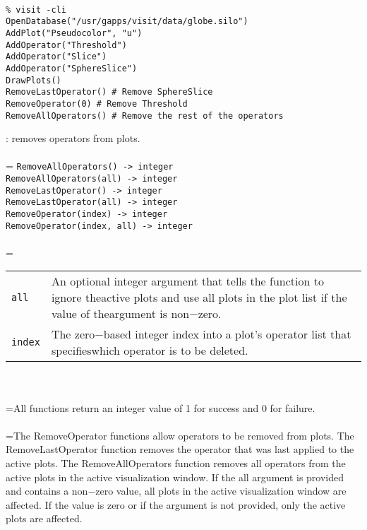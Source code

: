\documentclass[10pt,a4paper]{report}
\begin{document}
\\[-6mm]
\begin{verbatim}% visit -cli
OpenDatabase("/usr/gapps/visit/data/globe.silo")
AddPlot("Pseudocolor", "u")
AddOperator("Threshold")
AddOperator("Slice")
AddOperator("SphereSlice")
DrawPlots()
RemoveLastOperator() # Remove SphereSlice
RemoveOperator(0) # Remove Threshold
RemoveAllOperators() # Remove the rest of the operators
\end{verbatim}
\newpage


{}
: removes operators from plots.\\[-3mm]

 \\ 
\hangindent=\parindent 
\verb!RemoveAllOperators() -> integer!\\ 
\verb!RemoveAllOperators(all) -> integer!\\ 
\verb!RemoveLastOperator() -> integer!\\ 
\verb!RemoveLastOperator(all) -> integer!\\ 
\verb!RemoveOperator(index) -> integer!\\ 
\verb!RemoveOperator(index, all) -> integer!\\ [-3mm]

 \\ 
\hangindent=\parindent 
\begin{tabular}{lp{9cm}}
\verb!all! & An optional integer argument that tells the function to ignore theactive plots and use all plots in the plot list if the value of theargument is non$-$zero. \\
\verb!index! & The zero$-$based integer index into a plot's operator list that specifieswhich operator is to be deleted. \\
\end{tabular} \\[-2mm]


 \\ 
\hangindent=\parindent All functions return an integer value of 1 for success and 0 for failure. \\[-3mm] 

 \\ 
\hangindent=\parindent The RemoveOperator functions allow operators to be removed from plots. The RemoveLastOperator function removes the operator that was last applied to the active plots. The RemoveAllOperators function removes all operators from the active plots in the active visualization window. If the all argument is provided and contains a non$-$zero value, all plots in the active visualization window are affected. If the value is zero or if the argument is not provided, only the active plots are affected. \\[-3mm] 
\end{document}
